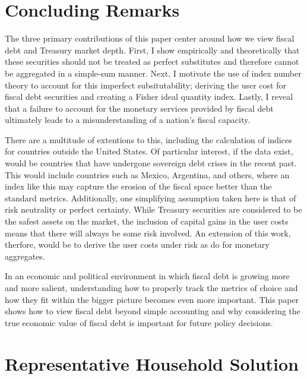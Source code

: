\documentclass[11pt,a4paper,margin=1.5in]{article}
\begin{document}
\section{Concluding Remarks}
\label{sec:Conclusion}
The three primary contributions of this paper center around how we view fiscal debt and Treasury market depth.
First, I show empirically and theoretically that these securities should not be treated as perfect substitutes and therefore cannot be aggregated in a simple-sum manner. 
Next, I motivate the use of index number theory to account for this imperfect subsitutability; deriving the user cost for fiscal debt securities and creating a Fisher ideal quantity index.
Lastly, I reveal that a failure to account for the monetary services provided by fiscal debt ultimately leads to a misunderstanding of a nation's fiscal capacity. 

There are a multitude of extentions to this, including the calculation of indices for countries outside the United States.
Of particular interest, if the data exist, would be countries that have undergone sovereign debt crises in the recent past.
This would include countries such as Mexico, Argentina, and others, where an index like this may capture the erosion of the fiscal space better than the standard metrics.
Additionally, one simplifying assumption taken here is that of risk neutrality or perfect certainty.
While Treasury securities are considered to be the safest assets on the market, the inclusion of capital gains in the user costs means that there will always be some risk involved.
An extension of this work, therfore, would be to derive the user costs under risk as \citet{Barnett-Liu-Jensen:1997} do for monetary aggregates.

In an economic and political environment in which fiscal debt is growing more and more salient, understanding how to properly track the metrics of choice and how they fit within the bigger picture becomes even more important.
This paper shows how to view fiscal debt beyond simple accounting and why considering the true economic value of fiscal debt is important for future policy decisions. 
\newpage




\newpage
\appendix
{}
\section{Representative Household Solution}
\label{app:HH_Solution}
\end{document}
